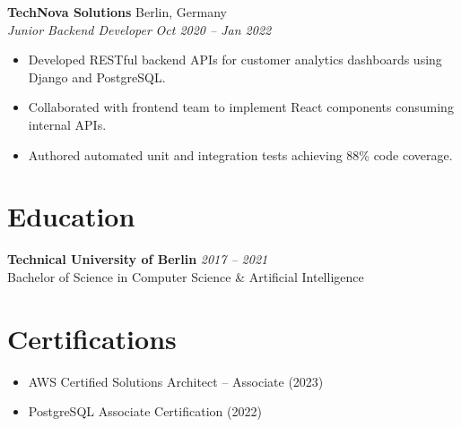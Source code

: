 \documentclass[10pt,a4paper]{article}
\begin{document}
\vspace{4pt}
\textbf{TechNova Solutions} \hfill Berlin, Germany \\
\textit{Junior Backend Developer} \hfill \textit{Oct 2020 -- Jan 2022}
\begin{itemize}[leftmargin=15pt, itemsep=2pt]
    \item Developed RESTful backend APIs for customer analytics dashboards using Django and PostgreSQL.
    \item Collaborated with frontend team to implement React components consuming internal APIs.
    \item Authored automated unit and integration tests achieving 88\% code coverage.
\end{itemize}

\vspace{6pt}
\section*{Education}
\textbf{Technical University of Berlin} \hfill \textit{2017 -- 2021} \\
Bachelor of Science in Computer Science \& Artificial Intelligence

\vspace{6pt}
\section*{Certifications}
\begin{itemize}[leftmargin=15pt, itemsep=2pt]
    \item AWS Certified Solutions Architect -- Associate (2023)
    \item PostgreSQL Associate Certification (2022)
\end{itemize}
\end{document}
